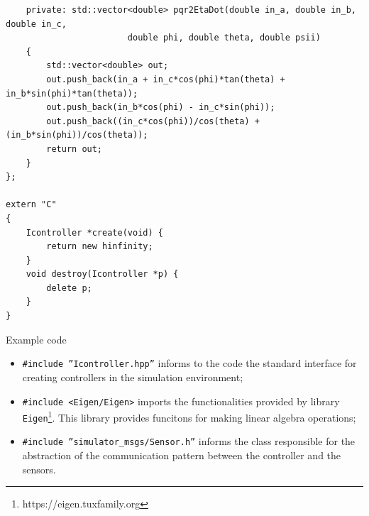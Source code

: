 %		
%		
%		
%		
%	
%	
%	
\begin{code}[H]
\begin{verbatim}
	private: std::vector<double> pqr2EtaDot(double in_a, double in_b, double in_c, 
						double phi, double theta, double psii)
	{
		std::vector<double> out;
		out.push_back(in_a + in_c*cos(phi)*tan(theta) + in_b*sin(phi)*tan(theta));
		out.push_back(in_b*cos(phi) - in_c*sin(phi));
		out.push_back((in_c*cos(phi))/cos(theta) + (in_b*sin(phi))/cos(theta));
		return out;
	}
};
	
extern "C"
{ 
	Icontroller *create(void) {
		return new hinfinity;
	}
	void destroy(Icontroller *p) {
		delete p;
	}
}
\end{verbatim}
\caption{Example code}
\label{exemplo1}
\end{code}

\begin{itemize}
		\setlength{\itemsep}{1pt}
		\setlength{\parskip}{0pt}
		\setlength{\parsep}{0pt}
\item \texttt{\#include ''Icontroller.hpp''} informs to the code the standard interface for creating controllers in the simulation environment;
\item \texttt{\#include <Eigen/Eigen>} imports the functionalities provided by library \texttt{Eigen}\footnote{https://eigen.tuxfamily.org}. This library provides funcitons for making linear algebra operations;
\item \texttt{\#include ''simulator\_msgs/Sensor.h''} informs the class responsible for the abstraction of the communication pattern between the controller and the sensors.
\end{itemize}

